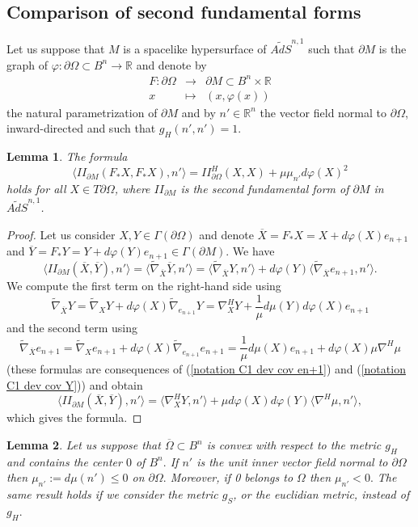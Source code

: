 \documentclass[10pt,reqno,oneside]{amsart}
\newtheorem{lem}{Lemma}[section]
\theoremstyle{definition}
\theoremstyle{remark}
\newcommand{\R}{\mathbb{R}}
\begin{document}
\subsection{Comparison of second fundamental forms}\label{app rel ff}
Let us suppose that $M$ is a spacelike hypersurface of $\widetilde{AdS}^{n,1}$ such that $\partial M$ is the graph of $\varphi:\partial \Omega\subset B^n\rightarrow\R$ and denote by \begin{eqnarray*}
F:\partial\Omega&\rightarrow&\partial M\subset B^n\times\R\\
x&\mapsto& (x,\varphi(x))
\end{eqnarray*}
the natural parametrization of $\partial M$ and by $n'\in\R^n$ the vector field normal to $\partial\Omega$, inward-directed and such that $g_H(n',n')=1.$ 
\begin{lem}\label{app rel ff}
The formula
$$\langle II_{\partial M}(F_*X,F_*X),n'\rangle=II_{\partial\Omega}^{H}(X,X)+\mu\mu_{n'}d\varphi(X)^2$$
holds for all $X\in T\partial\Omega$, where $II_{\partial M}$ is the second fundamental form of $\partial M$ in $\widetilde{AdS}^{n,1}$.
\end{lem}
\begin{proof}
Let us consider $X,Y\in\Gamma(\partial\Omega)$ and denote $\overline{X}=F_*X=X+d\varphi(X)e_{n+1}$ and  $\overline{Y}=F_*Y=Y+d\varphi(Y)e_{n+1}\in\Gamma(\partial M)$. We have
$$\langle II_{\partial M}(\overline{X},\overline{Y}),n'\rangle=\langle \widetilde{\nabla}_{\overline{X}}\overline{Y},n'\rangle=\langle\widetilde{\nabla}_{\overline{X}}Y,n'\rangle+d\varphi(Y)\langle \widetilde{\nabla}_{\overline{X}}e_{n+1},n'\rangle.$$
We compute the first term on the right-hand side using
$$\widetilde{\nabla}_{\overline{X}}Y=\widetilde{\nabla}_{X}Y+d\varphi(X)\widetilde{\nabla}_{e_{n+1}}Y=\nabla^H_{X}Y+\frac{1}{\mu}d\mu(Y)d\varphi(X)e_{n+1}$$
and the second term using
$${\widetilde{\nabla}}_{\overline{X}}e_{n+1}=\widetilde{\nabla}_{X}e_{n+1}+d\varphi(X)\widetilde{\nabla}_{e_{n+1}}e_{n+1}=\frac{1}{\mu}d\mu(X)e_{n+1}+d\varphi(X)\mu\nabla^H\mu$$
(these formulas are consequences of (\ref{notation C1 dev cov en+1}) and (\ref{notation C1 dev cov Y})) and obtain
$$\langle II_{\partial M}(\overline{X},\overline{Y}),n'\rangle=\langle\nabla^H_{X}Y,n'\rangle+\mu d\varphi(X)d\varphi(Y)\langle\nabla^H\mu,n'\rangle,$$
which gives the formula.
\end{proof}
\begin{lem}\label{app mun negatif}
Let us suppose that $\overline{\Omega}\subset B^n$ is convex with respect to the metric $g_H$ and contains the center $0$ of $B^n.$ If $n'$ is the unit inner vector field normal to $\partial\Omega$ then $\mu_{n'}:=d\mu(n')\leq 0$ on $\partial\Omega.$ Moreover, if 0 belongs to $\Omega$ then $\mu_{n'}<0.$ The same result holds if we consider the metric $g_S$, or the euclidian metric, instead of $g_H.$
\end{lem}
\end{document}

